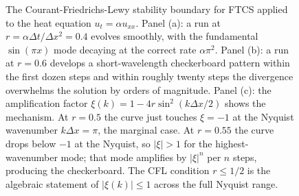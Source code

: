 \begin{figure}[p]
\vspace{1.5ex}


\caption[CFL stability of FTCS for the heat equation]{The
Courant-Friedrichs-Lewy stability boundary for FTCS applied to the
heat equation $u_t = \alpha u_{xx}$. Panel (a): a run at $r =
\alpha \Delta t / \Delta x^{2} = 0.4$ evolves smoothly, with the
fundamental $\sin(\pi x)$ mode decaying at the correct rate
$\alpha \pi^{2}$. Panel (b): a run at $r = 0.6$ develops a
short-wavelength checkerboard pattern within the first dozen steps
and within roughly twenty steps the divergence overwhelms the
solution by orders of magnitude. Panel (c): the amplification
factor $\xi(k) = 1 - 4 r \sin^{2}(k \Delta x / 2)$ shows the
mechanism. At $r = 0.5$ the curve just touches $\xi = -1$ at the
Nyquist wavenumber $k \Delta x = \pi$, the marginal case. At $r =
0.55$ the curve drops below $-1$ at the Nyquist, so $|\xi| > 1$ for
the highest-wavenumber mode; that mode amplifies by $|\xi|^{n}$ per
$n$ steps, producing the checkerboard. The CFL condition
$r \le 1/2$ is the algebraic statement of $|\xi(k)| \le 1$ across
the full Nyquist range. \cite{paper:v2ch12-courant-friedrichs-lewy-1928}}
\label{fig:vol02:ch12:cfl-stability}
\end{figure}
